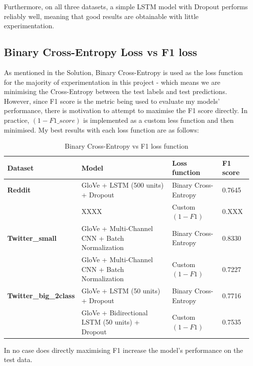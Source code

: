 \documentclass[12pt,a4paper]{article}
\begin{document}
Furthermore, on all three datasets, a simple LSTM model with Dropout performs reliably well, meaning that good results are obtainable with little experimentation.


\subsection{Binary Cross-Entropy Loss vs F1 loss}
As mentioned in the Solution, Binary Cross-Entropy is used as the loss function for the majority of experimentation in this project - which means we are minimising the Cross-Entropy between the test labels and test predictions. However, since F1 score is the metric being used to evaluate my models' performance, there is motivation to attempt to maximise the F1 score directly. In practice, $(1-F1\_score)$ is implemented as a custom less function and then minimised. My best results with each loss function are as follows:

\begin{table}[H]
	\centering
	\vspace*{-10pt}
	\caption{Binary Cross-Entropy vs F1 loss function}
	\label{F1Loss}
	\hspace*{-2.0cm}
	\begin{tabular}{p{3.2cm} p{9cm} p{3.9cm} p{1.7cm}} \hline\hline
		\textbf{Dataset} & \textbf{Model} & \textbf{Loss function} & \textbf{F1 score}  \\ \hline
		
		\textbf{Reddit} & GloVe + LSTM (500 units) + Dropout & Binary Cross-Entropy & 0.7645  \\
		& XXXX & Custom $(1-F1)$ & 0.XXX  \\ \hline
		
		\textbf{Twitter\_small} & GloVe + Multi-Channel CNN + Batch Normalization & Binary Cross-Entropy & 0.8330 \\
		& GloVe + Multi-Channel CNN + Batch Normalization & Custom $(1-F1)$ & 0.7227 \\ \hline
		
		\textbf{Twitter\_big\_2class} & GloVe + LSTM (50 units) + Dropout & Binary Cross-Entropy & 0.7716 \\
		& GloVe + Bidirectional LSTM (50 units) + Dropout & Custom $(1-F1)$ & 0.7535 \\ \hline
	\end{tabular}
\end{table}

In no case does directly maximising F1 increase the model's performance on the test data. 
\end{document}
